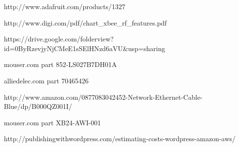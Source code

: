 \documentclass[PPFS.tex]{template/subfiles}
\begin{document}
\begin{thebibliography}{}
http://www.adafruit.com/products/1327

http://www.digi.com/pdf/chart\_xbee\_rf\_features.pdf

https://drive.google.com/folderview?id=0ByRzevjyNjCMeE1sSElHNzd6aVU\&usp=sharing

mouser.com part 852-LS027B7DH01A

alliedelec.com part 70465426 

http://www.amazon.com/0877083042452-Network-Ethernet-Cable-Blue/dp/B000QZ001I/

mouser.com part XB24-AWI-001

http://publishingwithwordpress.com/estimating-costs-wordpress-amazon-aws/

\end{thebibliography}
\end{document}
